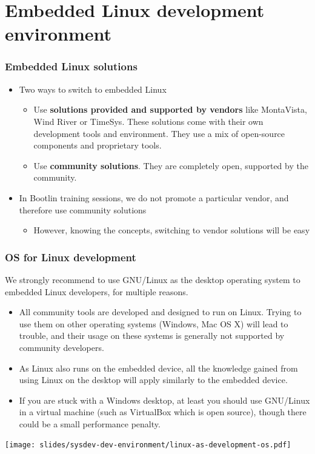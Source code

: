 \section{Embedded Linux development environment}

\begin{frame}
  \frametitle{Embedded Linux solutions}
  \begin{itemize}
  \item Two ways to switch to embedded Linux
    \begin{itemize}
    \item Use {\bf solutions provided and supported by vendors} like
      MontaVista, Wind River or TimeSys. These solutions come with
      their own development tools and environment. They use a mix of
      open-source components and proprietary tools.
    \item Use {\bf community solutions}. They are completely open,
      supported by the community.
    \end{itemize}
  \item In Bootlin training sessions, we do not promote a particular
    vendor, and therefore use community solutions
    \begin{itemize}
    \item However, knowing the concepts, switching to vendor solutions will be easy
    \end{itemize}
  \end{itemize}
\end{frame}

\begin{frame}
  \frametitle{OS for Linux development}
  We strongly recommend to use GNU/Linux as the desktop operating
  system to embedded Linux developers, for multiple reasons.
  \begin{itemize}
  \item All community tools are developed and designed to run on
    Linux. Trying to use them on other operating systems (Windows, Mac
    OS X) will lead to trouble, and their usage on these systems is
    generally not supported by community developers.
  \item As Linux also runs on the embedded device, all the knowledge
    gained from using Linux on the desktop will apply similarly to the
    embedded device.
  \item If you are stuck with a Windows desktop, at least you should
    use GNU/Linux in a virtual machine (such as VirtualBox which is open
    source), though there could be a small performance penalty.
  \end{itemize}
  \begin{center}
    \texttt{[image: slides/sysdev-dev-environment/linux-as-development-os.pdf]}
  \end{center}
\end{frame}

